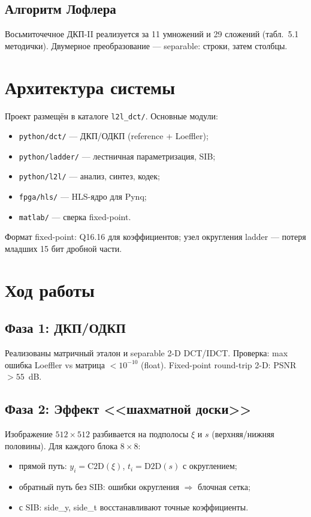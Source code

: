 \documentclass[12pt,a4paper]{article}
\begin{document}
\subsection{Алгоритм Лофлера}

Восьмиточечное ДКП-II реализуется за 11 умножений и 29 сложений (табл.~5.1 методички). Двумерное преобразование --- separable: строки, затем столбцы.

\section{Архитектура системы}

Проект размещён в каталоге \texttt{l2l\_dct/}. Основные модули:
\begin{itemize}
\item \texttt{python/dct/} --- ДКП/ОДКП (reference + Loeffler);
\item \texttt{python/ladder/} --- лестничная параметризация, SIB;
\item \texttt{python/l2l/} --- анализ, синтез, кодек;
\item \texttt{fpga/hls/} --- HLS-ядро для Pynq;
\item \texttt{matlab/} --- сверка fixed-point.
\end{itemize}

Формат fixed-point: Q16.16 для коэффициентов; узел округления ladder --- потеря младших 15 бит дробной части.

\section{Ход работы}

\subsection{Фаза 1: ДКП/ОДКП}

Реализованы матричный эталон и separable 2-D DCT/IDCT. Проверка: max ошибка Loeffler vs матрица $< 10^{-10}$ (float). Fixed-point round-trip 2-D: PSNR $> 55$~dB.

\subsection{Фаза 2: Эффект <<шахматной доски>>}

Изображение $512 \times 512$ разбивается на подполосы $\xi$ и $s$ (верхняя/нижняя половины). Для каждого блока $8 \times 8$:
\begin{itemize}
\item прямой путь: $y_i = \mathrm{C2D}(\xi)$, $t_i = \mathrm{D2D}(s)$ с округлением;
\item обратный путь без SIB: ошибки округления $\Rightarrow$ блочная сетка;
\item с SIB: side\_y, side\_t восстанавливают точные коэффициенты.
\end{itemize}
\end{document}
